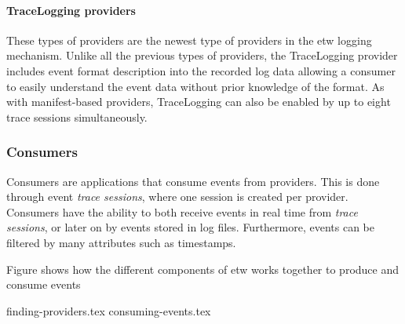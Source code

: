 \documentclass{report}
\begin{document}
\paragraph{TraceLogging providers}
These types of providers are the newest type of providers in the \gls{etw} logging mechanism. Unlike all the previous types of providers, the TraceLogging provider includes event format description into the recorded log data\cite{url:etw:provider-types} allowing a consumer to easily understand the event data without prior knowledge of the format. As with manifest-based providers, TraceLogging can also be enabled by up to eight trace sessions simultaneously.

\subsubsection{Consumers}
Consumers are applications that consume events from providers. This is done through event \emph{trace sessions}, where one session is created per provider. Consumers have the ability to both receive events in real time from \emph{trace sessions}, or later on by events stored in log files. Furthermore, events can be filtered by many attributes such as timestamps.

Figure  shows how the different components of \gls{etw} works together to produce and consume events


{finding-providers.tex}
{consuming-events.tex}

\end{document}
